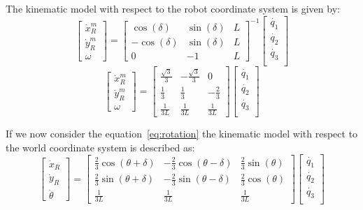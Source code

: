 The kinematic model with respect to the robot coordinate system is given by:
\begin{equation}
\begin{bmatrix}
\dot{x}^m _R\\
\dot{y}^m _R\\
{\omega}
\end{bmatrix} =
\begin{bmatrix}
\cos(\delta) & \sin(\delta) & L\\
-\cos(\delta) & \sin(\delta) & L\\
0 & -1 & L
\end{bmatrix}^{-1}
\begin{bmatrix}
\dot{q_1}\\
\dot{q_2}\\
\dot{q_3}\\
\end{bmatrix}	
\label{model1}
\end{equation}
\begin{equation*}
	\begin{bmatrix}
		\dot{x}^m _R\\
		\dot{y}^m _R\\
		{\omega}
	\end{bmatrix} =
	\begin{bmatrix}
		\frac{\sqrt{3}}{3} & -\frac{\sqrt{3}}{3} & 0\\
		\frac{1}{3} & \frac{1}{3} & -\frac{2}{3}\\
		\frac{1}{3L} & \frac{1}{3L} & \frac{1}{3L}
	\end{bmatrix}
	\begin{bmatrix}
		\dot{q_1}\\
		\dot{q_2}\\
		\dot{q_3}\\
	\end{bmatrix}	
\end{equation*}

If we now consider the equation~\ref{eq:rotation} the kinematic model with respect to the world coordinate system is described as:
\begin{equation}
\begin{bmatrix}
\dot{x}_R\\
\dot{y}_R\\
\dot{\theta}
\end{bmatrix} =
\begin{bmatrix}
\frac{2}{3}\cos(\theta+\delta) & -\frac{2}{3}\cos(\theta-\delta) & \frac{2}{3}\sin(\theta)\\
\frac{2}{3}\sin(\theta+\delta) & -\frac{2}{3}\sin(\theta-\delta) & \frac{2}{3}\cos(\theta)\\
\frac{1}{3L} & \frac{1}{3L} & \frac{1}{3L}
\end{bmatrix}
\begin{bmatrix}
\dot{q_1}\\
\dot{q_2}\\
\dot{q_3}\\
\end{bmatrix}	
\label{model2}
\end{equation}

